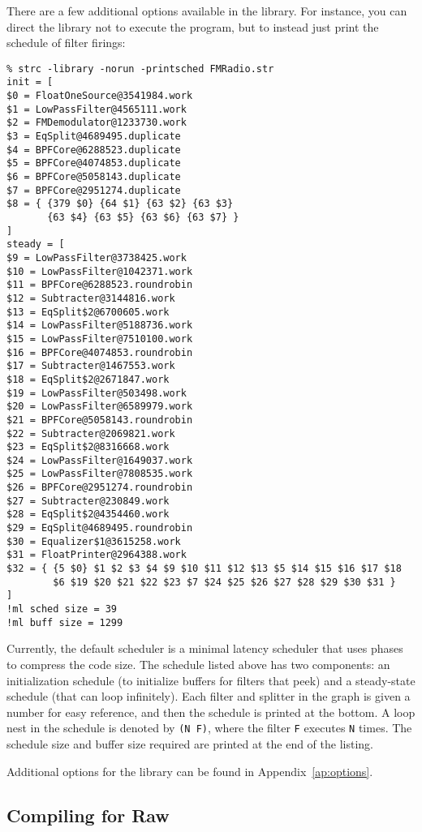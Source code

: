 There are a few additional options available in the library.  For
instance, you can direct the library not to execute the program, but
to instead just print the schedule of filter firings:
{\small
\begin{verbatim}
% strc -library -norun -printsched FMRadio.str
init = [
$0 = FloatOneSource@3541984.work
$1 = LowPassFilter@4565111.work
$2 = FMDemodulator@1233730.work
$3 = EqSplit@4689495.duplicate
$4 = BPFCore@6288523.duplicate
$5 = BPFCore@4074853.duplicate
$6 = BPFCore@5058143.duplicate
$7 = BPFCore@2951274.duplicate
$8 = { {379 $0} {64 $1} {63 $2} {63 $3} 
       {63 $4} {63 $5} {63 $6} {63 $7} }
]
steady = [
$9 = LowPassFilter@3738425.work
$10 = LowPassFilter@1042371.work
$11 = BPFCore@6288523.roundrobin
$12 = Subtracter@3144816.work
$13 = EqSplit$2@6700605.work
$14 = LowPassFilter@5188736.work
$15 = LowPassFilter@7510100.work
$16 = BPFCore@4074853.roundrobin
$17 = Subtracter@1467553.work
$18 = EqSplit$2@2671847.work
$19 = LowPassFilter@503498.work
$20 = LowPassFilter@6589979.work
$21 = BPFCore@5058143.roundrobin
$22 = Subtracter@2069821.work
$23 = EqSplit$2@8316668.work
$24 = LowPassFilter@1649037.work
$25 = LowPassFilter@7808535.work
$26 = BPFCore@2951274.roundrobin
$27 = Subtracter@230849.work
$28 = EqSplit$2@4354460.work
$29 = EqSplit@4689495.roundrobin
$30 = Equalizer$1@3615258.work
$31 = FloatPrinter@2964388.work
$32 = { {5 $0} $1 $2 $3 $4 $9 $10 $11 $12 $13 $5 $14 $15 $16 $17 $18
        $6 $19 $20 $21 $22 $23 $7 $24 $25 $26 $27 $28 $29 $30 $31 }
]
!ml sched size = 39
!ml buff size = 1299
\end{verbatim}
} 
%
Currently, the default scheduler is a minimal latency scheduler that
uses phases to compress the code size.  The schedule listed above has
two components: an initialization schedule (to initialize buffers for
filters that peek) and a steady-state schedule (that can loop
infinitely).  Each filter and splitter in the graph is given a number
for easy reference, and then the schedule is printed at the bottom.  A
loop nest in the schedule is denoted by {\tt (N F)}, where the filter
{\tt F} executes {\tt N} times.  The schedule size and buffer size
required are printed at the end of the listing.

Additional options for the library can be found in
Appendix~\ref{ap:options}.

\subsection{Compiling for Raw}

